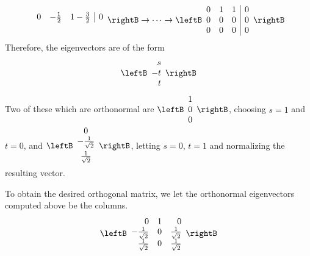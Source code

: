 \begin{solution}
\begin{equation*}
\begin{array}{ccc|c}
0 & -\vspace{0.05in}\frac{1}{2} & 1-\vspace{0.05in}\frac{3}{2} & 0
\end{array}
\rightB
\rightarrow \cdots \rightarrow
\leftB
\begin{array}{rrr|r}
0 & 1 & 1 & 0 \\ 
0 & 0 & 0 & 0 \\ 
0 & 0 & 0 & 0
\end{array}
\rightB
\end{equation*}
Therefore, the eigenvectors are of the form 
\begin{equation*}
\leftB
\begin{array}{r}
s \\ 
-t \\ 
t
\end{array}
\rightB
\end{equation*}
Two of these which are orthonormal are $\leftB
\begin{array}{c}
1 \\ 
0 \\ 
0
\end{array}
\rightB$, choosing $s=1$ and $t=0$, and $\leftB
\begin{array}{c}
0 \\ 
-\vspace{0.05in}\frac{1}{\sqrt{2}} \\ 
\vspace{0.05in}\frac{1}{\sqrt{2}}
\end{array}
\rightB$, letting $s=0$, $t= 1 $ and normalizing the resulting vector.

To obtain the desired orthogonal matrix, we let the orthonormal eigenvectors computed above be the columns. 
\begin{equation*}
\leftB 
\begin{array}{rrr}
0 & 1 & 0 \\ 
-\frac{1}{\sqrt{2}} & 0 & \frac{1}{\sqrt{2}} \\ 
\frac{1}{\sqrt{2}} & 0 & \frac{1}{\sqrt{2}}
\end{array}
\rightB
\end{equation*}


\end{solution}
